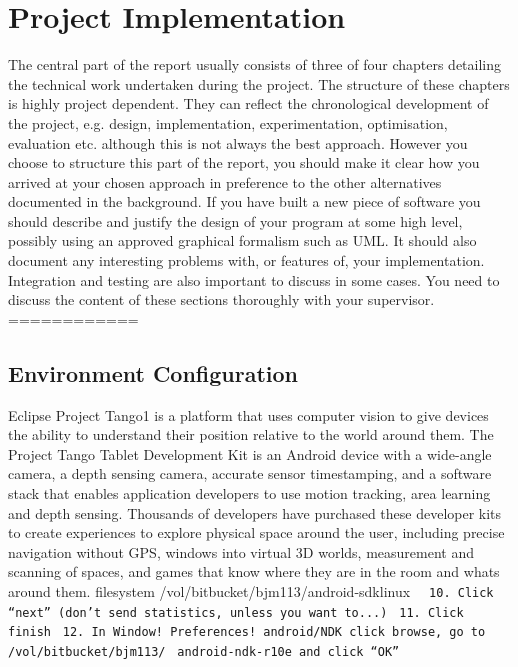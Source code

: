 \documentclass[12pt,twoside]{article}
\begin{document}
\newpage

\section{Project Implementation}

The central part of the report usually consists of three of four chapters detailing the technical work undertaken during the project. The structure of these chapters is highly project dependent. They can reflect the chronological development of the project, e.g. design, implementation, experimentation, optimisation, evaluation etc. although this is not always the best approach. However you choose to structure this part of the report, you should make it clear how you arrived at your chosen approach in preference to the other alternatives documented in the background. If you have built a new piece of software you should describe and justify the design of your program at some high level, possibly using an approved graphical formalism such as UML. It should also document any interesting problems with, or features of, your implementation. Integration and testing are also important to discuss in some cases. You need to discuss the content of these sections thoroughly with your supervisor.\\

============\\
\subsection{Environment Configuration}
Eclipse 
Project Tango1 is a platform that uses computer vision to give devices the ability to understand their
position relative to the world around them. The Project Tango Tablet Development Kit is an Android
device with a wide-angle camera, a depth sensing camera, accurate sensor timestamping, and a software
stack that enables application developers to use motion tracking, area learning and depth sensing.
Thousands of developers have purchased these developer kits to create experiences to explore physical
space around the user, including precise navigation without GPS, windows into virtual 3D worlds,
measurement and scanning of spaces, and games that know where they are in the room and whats
around them.
filesystem /vol/bitbucket/bjm113/android-sdklinux
\verb|  10. Click “next” (don’t send statistics, unless you want to...)|
\verb| 11. Click finish|
\verb| 12. In Window! Preferences! android/NDK click browse, go to /vol/bitbucket/bjm113/|
\verb| android-ndk-r10e and click “OK”|
\end{document}
